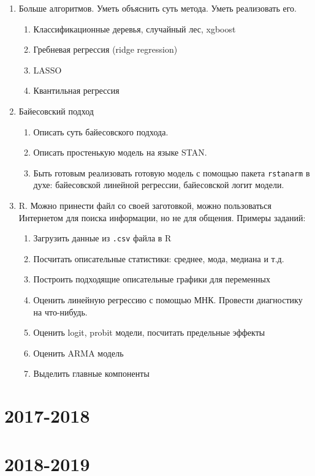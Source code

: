 \documentclass[12pt, a4paper]{article}
\theoremstyle{definition}
\begin{document}
\begin{enumerate}
\item Больше алгоритмов. Уметь объяснить суть метода. Уметь реализовать его. %
\begin{enumerate}
\item Классификационные деревья, случайный лес, xgboost
\item Гребневая регрессия (ridge regression)
\item LASSO
\item Квантильная регрессия
\end{enumerate}

\item Байесовский подход
\begin{enumerate}
\item Описать суть байесовского подхода.
\item Описать простенькую модель на языке STAN.
\item Быть готовым реализовать готовую модель с помощью пакета \verb|rstanarm| в духе: байесовской линейной регрессии, байесовской логит модели.
\end{enumerate}

\item R. Можно принести файл со своей заготовкой, можно пользоваться Интернетом для поиска информации, но не для общения. Примеры заданий:
\begin{enumerate}
\item Загрузить данные из \verb|.csv| файла в R
\item Посчитать описательные статистики: среднее, мода, медиана и т.д.
\item Построить подходящие описательные графики для переменных
\item Оценить линейную регрессию с помощью МНК. Провести диагностику на что-нибудь.
\item Оценить logit, probit модели, посчитать предельные эффекты
\item Оценить ARMA модель
\item Выделить главные компоненты
\end{enumerate}


\end{enumerate}


\section{2017-2018}



\section{2018-2019}


\end{document}
